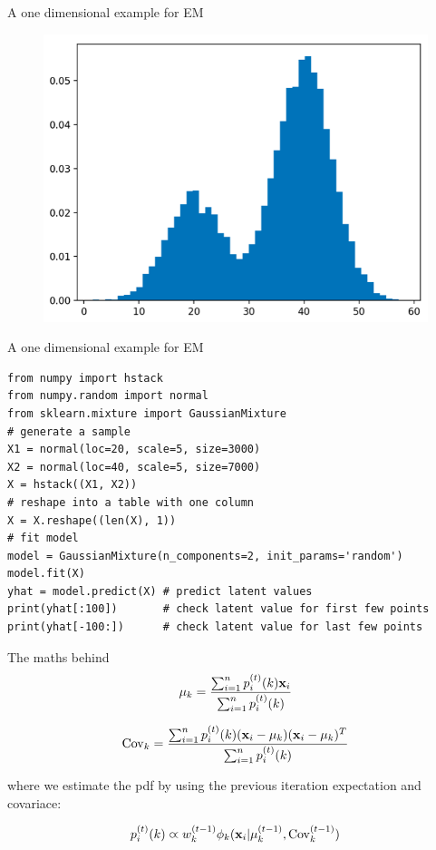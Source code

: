 \documentclass{beamer}
\begin{document}
\begin{frame}{A one dimensional example for EM}
    \begin{figure}
        \includegraphics[width=0.7\linewidth]{hist}
    \end{figure}
\end{frame}

\begin{frame}[fragile]{A one dimensional example for EM}
    \small
    \begin{lstlisting}
from numpy import hstack
from numpy.random import normal
from sklearn.mixture import GaussianMixture
# generate a sample
X1 = normal(loc=20, scale=5, size=3000)
X2 = normal(loc=40, scale=5, size=7000)
X = hstack((X1, X2))
# reshape into a table with one column
X = X.reshape((len(X), 1))
# fit model
model = GaussianMixture(n_components=2, init_params='random')
model.fit(X)
yhat = model.predict(X) # predict latent values
print(yhat[:100])       # check latent value for first few points
print(yhat[-100:])      # check latent value for last few points
    \end{lstlisting}
    \normalsize
\end{frame}

\begin{frame}{The maths behind}
    \[\mu_k = \frac{\sum_{i=1}^n p_i^{(t)}(k)\textbf{x}_i}{\sum_{i=1}^n p_i^{(t)}(k)}\]

    \[\mathrm{Cov}_k=\frac{\sum_{i=1}^n p_i^{(t)}(k)(\textbf{x}_i-\mu_k)(\textbf{x}_i-\mu_k)^T}{\sum_{i=1}^n p_i^{(t)}(k)}\]

    where we estimate the pdf by using the previous iteration expectation and covariace:

    \[p_i^{(t)}(k) \varpropto w_k^{(t-1)} \phi_k(\textbf{x}_i | \mu_k^{(t-1)},\mathrm{Cov}_k^{(t-1)})\]
\end{frame}
\end{document}
